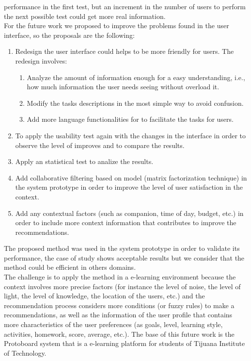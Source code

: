 performance in the first test, but an increment in the number of users
to perform the next possible test could get more real information.\\
For the future work we proposed to improve the problems found 
in the user interface, so the proposals are the following:
\begin{enumerate} 
\item  Redesign the user interface could helps to be more friendly for
users. The redesign involves:
  \begin{enumerate}  
  \item Analyze the amount of information enough for a easy understanding, 
  i.e., how much information the user needs seeing without overload it.
  \item Modify the tasks descriptions in the most simple way to avoid 
  confusion.
  \item Add more language functionalities for to facilitate the tasks 
  for users.
  \end{enumerate}
\item To apply the usability test again with the changes in the interface 
in order to observe the level of improves and to compare the results. 
\item Apply an statistical test to analize the results.
\item Add collaborative filtering based on model (matrix
factorization technique) in the system prototype in order to improve 
the level of user satisfaction in the context.
\item Add any contextual factors (such as companion, time of day, 
budget, etc.) in order to include more context information that contributes
to improve the recommendations.
\end{enumerate}
The proposed method was used in the system prototype in order to
validate its performance, the case of study shows acceptable results
but we consider that the method could be efficient in others domains.\\ 
The challenge is to apply the method in a e-learning environment
because the context involves more precise factors (for instance the
level of noise, the level of light, the level of knowledge, the location 
of the users, etc.) and the recommendation process considers more 
conditions (or fuzzy rules) to make a recommendations, as well as the information 
of the user profile that contains more characteristics of the user
preferences (as goals, level, learning style, activities, homework,
score, average, etc.). The base of this future work is the Protoboard
system  \cite{garcia2007simple} that is a e-learning platform
for students of Tijuana Institute of Technology.







